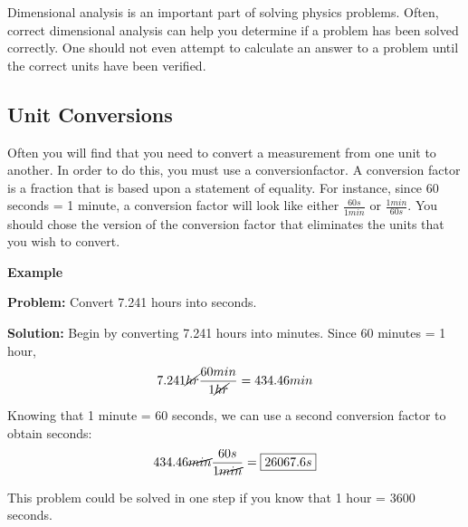 	Dimensional analysis is an important part of solving physics problems.  Often, correct dimensional analysis can help you determine if a problem has been solved correctly.  One should not even attempt to calculate an answer to a problem until the correct units have been verified. 

	\subsection{Unit Conversions} 
	Often you will find that you need to convert a measurement from one unit to another.  In order to do this, you must use a \gls{conversionfactor}.  A conversion factor is a fraction that is based upon a statement of equality.  For instance, since 60 seconds = 1 minute, a conversion factor will look like either $\frac{60s}{1 min}$ or $\frac{1 min}{60s}$.  You should chose the version of the conversion factor that eliminates the units that you wish to convert.  
	
	
		\begin{mdframed}[backgroundcolor=blue!10!white]
		\begin{center}
			\textbf{Example \thesubsection}	\label{ex113}
		\end{center}
	
		\vspace{0.1in}	
		\textbf{Problem:} Convert 7.241 hours into seconds. 
		\vspace{0.1in}
		
		\textbf{Solution:} Begin by converting 7.241 hours into minutes.  Since 60 minutes = 1 hour, 
			\begin{equation*}
			7.241 \cancel{hr} \frac{60 min}{1 \cancel{hr}} = 434.46 min
			\end{equation*}
		
		Knowing that 1 minute = 60 seconds, we can use a second conversion factor to obtain seconds:
			\begin{equation*}
			434.46 \cancel{min} \frac{60 s}{1 \cancel{min}} = \boxed{26067.6s}
			\end{equation*}
		
		This problem could be solved in one step if you know that 1 hour = 3600 seconds. 
	
	\end{mdframed}


